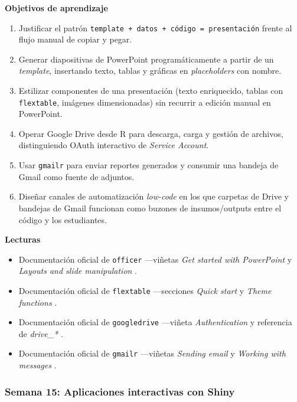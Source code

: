 \documentclass[11pt,letterpaper]{article}
\newcommand{\semana}[2]{%
  \subsubsection*{\color{main}Semana #1: #2}%
}
\begin{document}
\medskip
\noindent\textbf{Objetivos de aprendizaje}
\begin{enumerate}[leftmargin=*, itemsep=1pt]
    \item Justificar el patrón \texttt{template + datos + código = presentación} frente al flujo manual de copiar y pegar.
    \item Generar diapositivas de PowerPoint programáticamente a partir de un \textit{template}, insertando texto, tablas y gráficas en \textit{placeholders} con nombre.
    \item Estilizar componentes de una presentación (texto enriquecido, tablas con \texttt{flextable}, imágenes dimensionadas) sin recurrir a edición manual en PowerPoint.
    \item Operar Google Drive desde R para descarga, carga y gestión de archivos, distinguiendo OAuth interactivo de \textit{Service Account}.
    \item Usar \texttt{gmailr} para enviar reportes generados y consumir una bandeja de Gmail como fuente de adjuntos.
    \item Diseñar canales de automatización \textit{low-code} en los que carpetas de Drive y bandejas de Gmail funcionan como buzones de insumos/outputs entre el código y los estudiantes.
\end{enumerate}

\medskip
\noindent\textbf{Lecturas}
\begin{itemize}[leftmargin=*, itemsep=1pt]
    \item Documentación oficial de \texttt{officer} ---viñetas \textit{Get started with PowerPoint} y \textit{Layouts and slide manipulation} \cite{gohel-officer}.
    \item Documentación oficial de \texttt{flextable} ---secciones \textit{Quick start} y \textit{Theme functions} \cite{gohel-flextable}.
    \item Documentación oficial de \texttt{googledrive} ---viñeta \textit{Authentication} y referencia de \textit{drive\_*} \cite{bryan-googledrive}.
    \item Documentación oficial de \texttt{gmailr} ---viñetas \textit{Sending email} y \textit{Working with messages} \cite{hester-gmailr}.
\end{itemize}

\semana{15}{Aplicaciones interactivas con Shiny}
\end{document}
